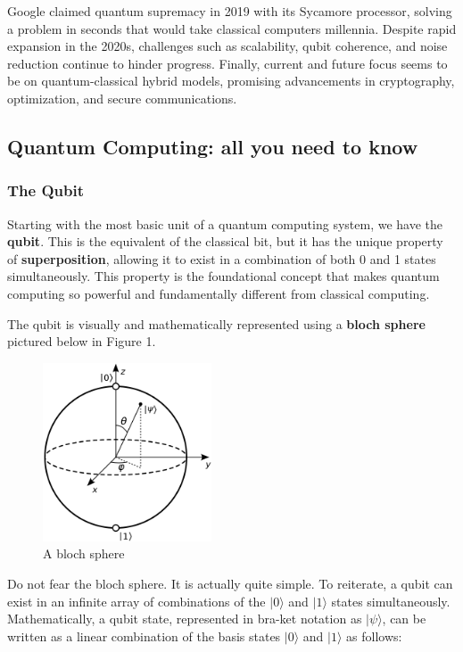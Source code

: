 Google claimed quantum supremacy in 2019 with its Sycamore processor, solving a problem in seconds that would take classical computers millennia. Despite rapid expansion in the 2020s, challenges such as scalability, qubit coherence, and noise reduction continue to hinder progress. Finally, current and future focus seems to be on quantum-classical hybrid models, promising advancements in cryptography, optimization, and secure communications.

\subsection{Quantum Computing: all you need to know}

\subsubsection*{The Qubit}

Starting with the most basic unit of a quantum computing system, we have the \textbf{qubit}. This is the equivalent of the classical bit, but it has the unique property of \textbf{superposition}, allowing it to exist in a combination of both 0 and 1 states simultaneously. This property is the foundational concept that makes quantum computing so powerful and fundamentally different from classical computing. \newline

The qubit is visually and mathematically represented using a \textbf{bloch sphere} pictured below in Figure 1. 

\begin{figure}[ht]
\centering
\includegraphics[width=5cm]{images/Bloch_sphere.svg.png}
\caption{A bloch sphere}
\end{figure}

Do not fear the bloch sphere. It is actually quite simple. To reiterate, a qubit can exist in an infinite array of combinations of the $|0\rangle$ and $|1\rangle$ states simultaneously\cite{refrence4}. Mathematically, a qubit state, represented in bra-ket notation as $|\psi\rangle$, can be written as a linear combination of the basis states $|0\rangle$ and $|1\rangle$ as follows:
 
